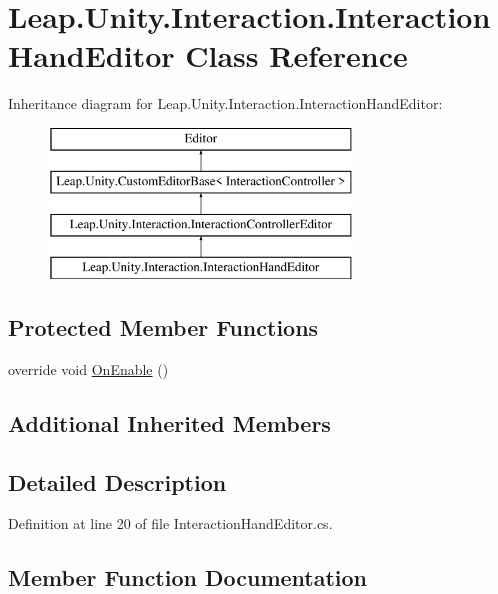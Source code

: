\hypertarget{class_leap_1_1_unity_1_1_interaction_1_1_interaction_hand_editor}{}\section{Leap.\+Unity.\+Interaction.\+Interaction\+Hand\+Editor Class Reference}
\label{class_leap_1_1_unity_1_1_interaction_1_1_interaction_hand_editor}
Inheritance diagram for Leap.\+Unity.\+Interaction.\+Interaction\+Hand\+Editor\+:\begin{figure}[H]
\begin{center}
\leavevmode
\includegraphics[height=4.000000cm]{class_leap_1_1_unity_1_1_interaction_1_1_interaction_hand_editor}
\end{center}
\end{figure}
\subsection*{Protected Member Functions}
\begin{DoxyCompactItemize}
\item 
override void \mbox{\hyperlink{class_leap_1_1_unity_1_1_interaction_1_1_interaction_hand_editor_acba8102c4783d1aead83f13213e949a7}{On\+Enable}} ()
\end{DoxyCompactItemize}
\subsection*{Additional Inherited Members}


\subsection{Detailed Description}


Definition at line 20 of file Interaction\+Hand\+Editor.\+cs.



\subsection{Member Function Documentation}
\mbox{\label{class_leap_1_1_unity_1_1_interaction_1_1_interaction_hand_editor_acba8102c4783d1aead83f13213e949a7}} 
